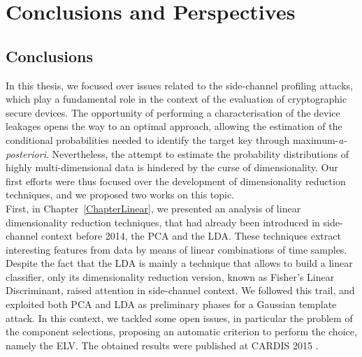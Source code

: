 
\chapter{Conclusions and Perspectives} %

\label{ChapterConclusions}



\section{Conclusions}
In this thesis, we focused over issues related to the side-channel profiling attacks, which play a fundamental role in the context of the evaluation of cryptographic secure devices. The opportunity of performing a characterisation of the device leakages opens the way to an optimal approach, allowing the estimation of the conditional probabilities needed to identify the target key through maximum-\textit{a-posteriori}. Nevertheless, the attempt to estimate the probability distributions of highly multi-dimensional data is hindered by the curse of dimensionality. Our first efforts were thus
focused over the development of dimensionality reduction techniques, and we proposed two works on this topic.\\
 
First, in Chapter~\ref{ChapterLinear}, we presented an analysis of linear dimensionality reduction techniques, that had already been introduced in side-channel context before 2014, the PCA and the LDA. These techniques extract interesting features from data by means of linear combinations of time samples. Despite the fact that the LDA is mainly a technique that allows to build a linear classifier, only its dimensionality reduction version, known as Fisher's Linear Discriminant, raised attention in side-channel context. We followed this trail, and exploited both PCA and LDA as preliminary phases for a Gaussian template attack. In this context, we tackled some open issues, in particular the problem of the component selections, proposing an automatic criterion to perform the choice, namely the ELV.  The obtained results were published at CARDIS 2015 \cite{Cagli2016}.\\

